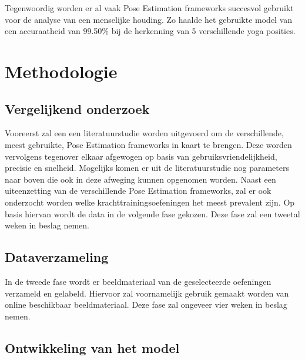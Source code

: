 Tegenwoordig worden er al vaak Pose Estimation frameworks succesvol gebruikt voor de analyse van een menselijke houding. Zo haalde het gebruikte model van \textcite{ParasharEtAl2023} een accuraatheid van 99.50\% bij de herkenning van 5 verschillende yoga posities.




\section{Methodologie}%
\label{sec:methodologie}
\subsection{Vergelijkend onderzoek}
\label{sec:vergelijkend onderzoek}

Vooreerst zal een een literatuurstudie worden uitgevoerd om de verschillende, meest gebruikte, Pose Estimation frameworks in kaart te brengen. Deze worden vervolgens tegenover elkaar afgewogen op basis van gebruiksvriendelijkheid, precisie en snelheid. Mogelijks komen er uit de literatuurstudie nog parameters naar boven die ook in deze afweging kunnen opgenomen worden. Naast een uiteenzetting van de verschillende Pose Estimation frameworks, zal er ook onderzocht worden welke krachttrainingsoefeningen het meest prevalent zijn. Op basis hiervan wordt de data in de volgende fase gekozen. Deze fase zal een tweetal weken in beslag nemen.

\subsection{Dataverzameling}
\label{sec:dataverzameling}

In de tweede fase wordt er beeldmateriaal van de geselecteerde oefeningen verzameld en gelabeld. Hiervoor zal voornamelijk gebruik gemaakt worden van online beschikbaar beeldmateriaal. Deze fase zal ongeveer vier weken in beslag nemen.

\subsection{Ontwikkeling van het model}
\label{sec:ontwikkeling van het model}

